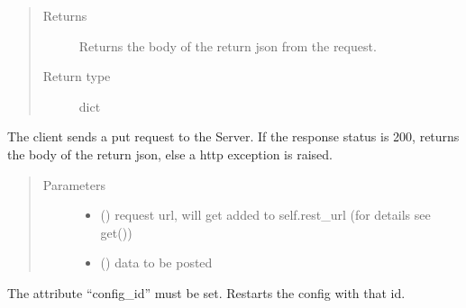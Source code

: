 \documentclass[letterpaper,10pt,english,openany,oneside]{sphinxmanual}
\begin{document}
\begin{fulllineitems}
\begin{fulllineitems}
\begin{quote}
\begin{description}
\item[{Returns}] \leavevmode
Returns the body of the return json from the request.

\item[{Return type}] \leavevmode
dict

\end{description}\end{quote}

\end{fulllineitems}


\begin{fulllineitems}
\label{\detokenize{_modules/AconitySTUDIO_client:AconitySTUDIO_client.AconitySTUDIO_client.put}}
The client sends a put request to the Server.
If the response status is 200, returns the body of the return json,
else a http exception is raised.
\begin{quote}\begin{description}
\item[{Parameters}] \leavevmode\begin{itemize}
\item {} 
 () \textendash{} request url, will get added to self.rest\_url (for details see get())

\item {} 
 () \textendash{} data to be posted

\end{itemize}

\end{description}\end{quote}

\end{fulllineitems}


\begin{fulllineitems}
\label{\detokenize{_modules/AconitySTUDIO_client:AconitySTUDIO_client.AconitySTUDIO_client.restart_config}}
The attribute “config\_id” must be set.
Restarts the config with that id.


\end{fulllineitems}
\end{fulllineitems}
\end{document}
